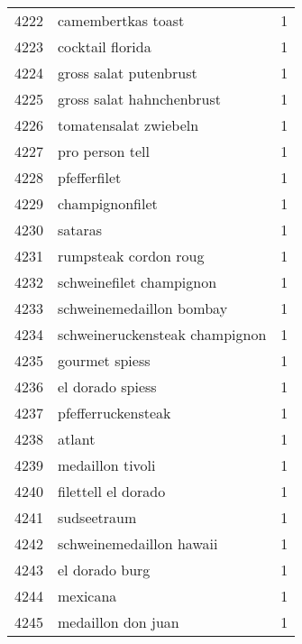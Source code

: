 \begin{tabular}{llr}
4222 &                                 camembertkas toast &      1 \\
4223 &                                   cocktail florida &      1 \\
4224 &                             gross salat putenbrust &      1 \\
4225 &                          gross salat hahnchenbrust &      1 \\
4226 &                              tomatensalat zwiebeln &      1 \\
4227 &                                    pro person tell &      1 \\
4228 &                                       pfefferfilet &      1 \\
4229 &                                    champignonfilet &      1 \\
4230 &                                            sataras &      1 \\
4231 &                              rumpsteak cordon roug &      1 \\
4232 &                           schweinefilet champignon &      1 \\
4233 &                           schweinemedaillon bombay &      1 \\
4234 &                     schweineruckensteak champignon &      1 \\
4235 &                                     gourmet spiess &      1 \\
4236 &                                   el dorado spiess &      1 \\
4237 &                                 pfefferruckensteak &      1 \\
4238 &                                             atlant &      1 \\
4239 &                                   medaillon tivoli &      1 \\
4240 &                                filettell el dorado &      1 \\
4241 &                                        sudseetraum &      1 \\
4242 &                           schweinemedaillon hawaii &      1 \\
4243 &                                     el dorado burg &      1 \\
4244 &                                           mexicana &      1 \\
4245 &                                 medaillon don juan &      1 \\

\end{tabular}
